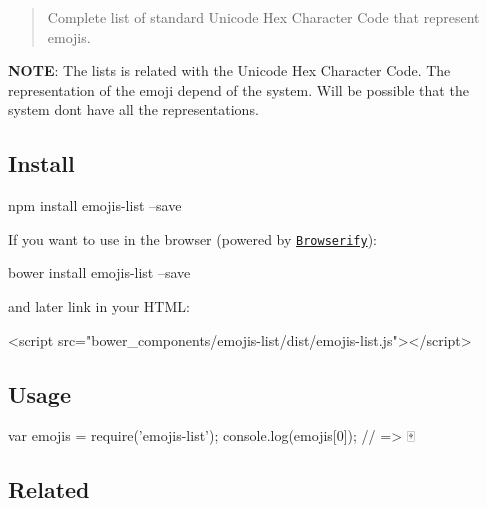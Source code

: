 \href{https://david-dm.org/Kikobeats/emojis-list}{\tt } \href{https://david-dm.org/Kikobeats/emojis-list#info=devDependencies}{\tt } \href{https://www.npmjs.org/package/emojis-list}{\tt } \href{https://paypal.me/kikobeats}{\tt }

\begin{quote}
Complete list of standard Unicode Hex Character Code that represent emojis. \end{quote}


{\bfseries N\+O\+TE}\+: The lists is related with the Unicode Hex Character Code. The representation of the emoji depend of the system. Will be possible that the system don\textquotesingle{}t have all the representations.

\subsection*{Install}


\begin{DoxyCode}
npm install emojis-list --save
\end{DoxyCode}


If you want to use in the browser (powered by \href{http://browserify.org/}{\tt Browserify})\+:


\begin{DoxyCode}
bower install emojis-list --save
\end{DoxyCode}


and later link in your H\+T\+ML\+:


\begin{DoxyCode}
<script src="bower\_components/emojis-list/dist/emojis-list.js"></script>
\end{DoxyCode}


\subsection*{Usage}


\begin{DoxyCode}
var emojis = require('emojis-list');
console.log(emojis[0]);
// => 🀄
\end{DoxyCode}


\subsection*{Related}


